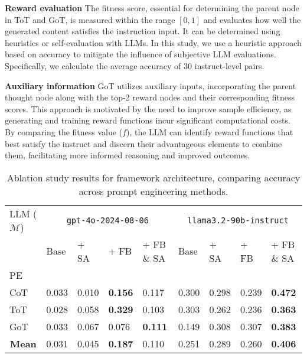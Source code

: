 \textbf{Reward evaluation}
The fitness score, essential for determining the parent node in ToT and GoT, is measured within the range \([0, 1]\) and evaluates how well the generated content satisfies the instruction input. It can be determined using heuristics or self-evaluation with LLMs. In this study, we use a heuristic approach based on accuracy to mitigate the influence of subjective LLM evaluations. Specifically, we calculate the average accuracy of 30 instruct-level pairs. 


\textbf{Auxiliary information}
GoT utilizes auxiliary inputs, incorporating the parent thought node along with the top-2 reward nodes and their corresponding fitness scores. This approach is motivated by the need to improve sample efficiency, as generating and training reward functions incur significant computational costs. By comparing the fitness value ($f$), the LLM can identify reward functions that best satisfy the instruct and discern their advantageous elements to combine them, facilitating more informed reasoning and improved outcomes.


\begin{table*}[!t]
\caption{Ablation study results for framework architecture, comparing accuracy across prompt engineering methods.}
\label{tab:ablation_study}
\begin{tabular}{p{2.2cm}|p{1.5cm}p{1.5cm}p{1.5cm}p{1.5cm}|p{1.5cm}p{1.5cm}p{1.5cm}p{1.5cm}}
\toprule
LLM ($\mathcal{M}$) & \multicolumn{4}{c|}{\texttt{gpt-4o-2024-08-06}} & \multicolumn{4}{c}{\texttt{llama3.2-90b-instruct}} \\
 & Base & + SA \cite{baek2024chatpcg} & + FB & + FB \& SA & Base & + SA \cite{baek2024chatpcg} & + FB & + FB \& SA \\
PE &  &  &  &  &  &  &  &  \\
\midrule
CoT & 0.033 & 0.010 & \textbf{0.156} & 0.117 & 0.300 & 0.298 & 0.239 & \textbf{0.472} \\
ToT & 0.028 & 0.058 & \textbf{0.329} & 0.103 & 0.303 & 0.262 & 0.236 & \textbf{0.363} \\
GoT & 0.033 & 0.067 & 0.076 & \textbf{0.111} & 0.149 & 0.308 & 0.307 & \textbf{0.383} \\
\midrule
\multicolumn{1}{c|}{\textbf{Mean}} & 0.031 & 0.045 & \textbf{0.187} & 0.110 & 0.251 & 0.289 & 0.260 & \textbf{0.406} \\
\bottomrule
\end{tabular}
\end{table*}
